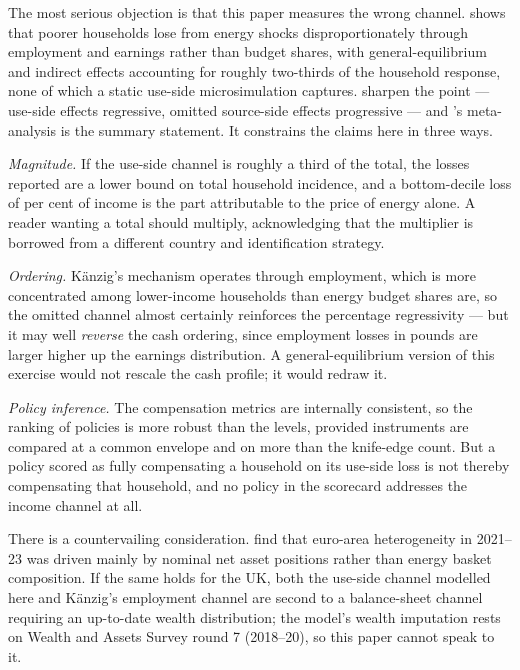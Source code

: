 The most serious objection is that this paper measures the wrong channel. \citet{kanzig2023} shows that poorer households lose from energy shocks disproportionately through employment and earnings rather than budget shares, with general-equilibrium and indirect effects accounting for roughly two-thirds of the household response, none of which a static use-side microsimulation captures. \citet{goulder2019} sharpen the point --- use-side effects regressive, omitted source-side effects progressive --- and \citet{ohlendorf2021}'s meta-analysis is the summary statement. It constrains the claims here in three ways.

\emph{Magnitude.} If the use-side channel is roughly a third of the total, the losses reported are a lower bound on total household incidence, and a bottom-decile loss of \genDecileOneLossPct{} per cent of income is the part attributable to the price of energy alone. A reader wanting a total should multiply, acknowledging that the multiplier is borrowed from a different country and identification strategy.

\emph{Ordering.} Känzig's mechanism operates through employment, which is more concentrated among lower-income households than energy budget shares are, so the omitted channel almost certainly reinforces the percentage regressivity --- but it may well \emph{reverse} the cash ordering, since employment losses in pounds are larger higher up the earnings distribution. A general-equilibrium version of this exercise would not rescale the cash profile; it would redraw it.

\emph{Policy inference.} The compensation metrics are internally consistent, so the ranking of policies is more robust than the levels, provided instruments are compared at a common envelope and on more than the knife-edge count. But a policy scored as fully compensating a household on its use-side loss is not thereby compensating that household, and no policy in the scorecard addresses the income channel at all.

There is a countervailing consideration. \citet{pallotti2024} find that euro-area heterogeneity in 2021--23 was driven mainly by nominal net asset positions rather than energy basket composition. If the same holds for the UK, both the use-side channel modelled here and Känzig's employment channel are second to a balance-sheet channel requiring an up-to-date wealth distribution; the model's wealth imputation rests on Wealth and Assets Survey round 7 (2018--20), so this paper cannot speak to it.


